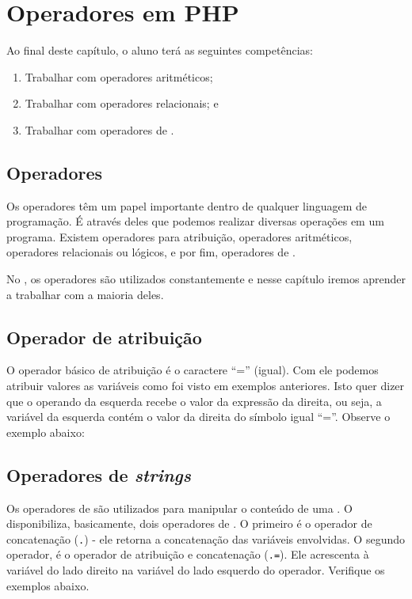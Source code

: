 \chapter{Operadores em PHP}

Ao final deste capítulo, o aluno terá as seguintes competências:
\begin{enumerate}
    \item Trabalhar com operadores aritméticos; 
    \item Trabalhar com operadores relacionais; e
    \item Trabalhar com operadores de \tipostring.
\end{enumerate}

\section{Operadores}
\label{operadores}

Os operadores têm um papel importante dentro de qualquer linguagem de programação.
É através deles que podemos realizar diversas operações em um programa. Existem
operadores para atribuição, operadores aritméticos, operadores relacionais ou lógicos,
e por fim, operadores de \tipostring.

No \php, os operadores são utilizados constantemente e nesse capítulo iremos
aprender a trabalhar com a maioria deles.

\section{Operador de atribuição}
\label{operador-atribuicao}

O operador básico de atribuição é o caractere ``='' (igual). Com ele podemos atribuir 
valores as variáveis como foi visto em exemplos anteriores. Isto quer dizer que o 
operando da esquerda recebe o valor da expressão da direita, ou seja, a variável da 
esquerda contém o valor da direita do símbolo igual ``=''. Observe o exemplo abaixo:



\section{Operadores de \textit{strings}}
\label{operadores-de-strings}
Os operadores de \tipostrings são utilizados para manipular o conteúdo de uma \tipostring.
O \php~ disponibiliza, basicamente, dois operadores de \tipostrings. O primeiro é o operador
de concatenação (\texttt{.}) - ele retorna a concatenação das variáveis envolvidas.
O segundo operador, é o operador de atribuição e concatenação (\texttt{.=}). Ele acrescenta
à variável do lado direito na variável do lado esquerdo do operador. Verifique os exemplos
abaixo.

